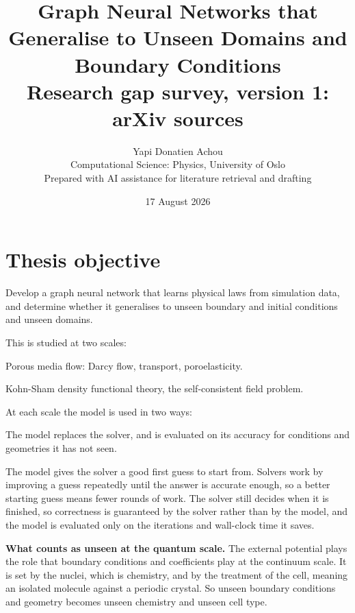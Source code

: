 \documentclass[11pt, a4paper]{article}
\title{\vspace{-14mm}\textbf{Graph Neural Networks that Generalise to Unseen
Domains and Boundary Conditions}\\[3mm]
\large Research gap survey, version 1: arXiv sources}
\author{Yapi Donatien Achou\\
\small Computational Science: Physics, University of Oslo\\
\small Prepared with AI assistance for literature retrieval and drafting}
\date{17 August 2026}
\begin{document}
\maketitle

\section{Thesis objective}

Develop a graph neural network that learns physical laws from simulation
data, and determine whether it generalises to unseen boundary and initial
conditions and unseen domains.

This is studied at two scales:

\begin{description}[style=unboxed, leftmargin=0pt, itemsep=2pt,
    font=\normalfont\itshape]
  \item[Continuum mechanics.] Porous media flow: Darcy flow, transport,
  poroelasticity.
  \item[Quantum mechanics.] Kohn-Sham density functional theory, the
  self-consistent field problem.
\end{description}

At each scale the model is used in two ways:

\begin{description}[style=unboxed, leftmargin=0pt, itemsep=2pt,
    font=\normalfont\itshape]
  \item[Surrogate mode.] The model replaces the solver, and is evaluated on
  its accuracy for conditions and geometries it has not seen.
  \item[Warm-start mode.] The model gives the solver a good first guess to
  start from. Solvers work by improving a guess repeatedly until the answer is
  accurate enough, so a better starting guess means fewer rounds of work. The
  solver still decides when it is finished, so correctness is guaranteed by the
  solver rather than by the model, and the model is evaluated only on the
  iterations and wall-clock time it saves.
\end{description}

\textbf{What counts as unseen at the quantum scale.} The external potential
plays the role that boundary conditions and coefficients play at the continuum
scale. It is set by the nuclei, which is chemistry, and by the treatment of
the cell, meaning an isolated molecule against a periodic crystal. So unseen
boundary conditions and geometry becomes unseen chemistry and unseen cell
type.
\end{document}
